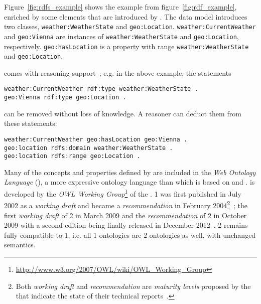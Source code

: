 Figure~\ref{fig:rdfs_example} shows the example from figure~\ref{fig:rdf_example}, enriched by some elements that are introduced by . The data model introduces two classes, \texttt{weather:\hspace{0pt}Weather\hspace{0pt}State} and \texttt{geo:\hspace{0pt}Location}. \texttt{weather:\hspace{0pt}CurrentWeather} and \texttt{geo:\hspace{0pt}Vienna} are instances of \texttt{weather:\hspace{0pt}Weather\hspace{0pt}State} and \texttt{geo:\hspace{0pt}Location}, respectively. \texttt{geo:\hspace{0pt}has\hspace{0pt}Location} is a property with range \texttt{weather:\hspace{0pt}Weather\hspace{0pt}State} and \texttt{geo:\hspace{0pt}Location}.

 comes with reasoning support~\cite{RDF_semantics}; e.g. in the above example, the statements

\begin{lstlisting}
weather:CurrentWeather rdf:type weather:WeatherState .
geo:Vienna rdf:type geo:Location .
\end{lstlisting}

can be removed without loss of knowledge. A reasoner can deduct them from these statements:

\begin{lstlisting}
weather:CurrentWeather geo:hasLocation geo:Vienna .
geo:location rdfs:domain weather:WeatherState .
geo:location rdfs:range geo:Location .
\end{lstlisting}

\vspace{1em}

Many of the concepts and properties defined by  are included in the \emph{Web Ontology Language} (), a more expressive ontology language than  which is based on  and .  is developed by the \emph{OWL Working Group}\footnote{\href{http://www.w3.org/2007/OWL/wiki/OWL\_Working\_Group}{http://www.w3.org/2007/OWL/wiki/OWL\_Working\_Group}} of the .  1 was first published in July 2002 as a \emph{working draft} and became a  \emph{recommendation} in February 2004\footnote{Both \emph{working draft} and \emph{recommendation} are \emph{maturity levels} proposed by the  that indicate the state of their technical reports~\cite{w3c-process}.}~\cite{OWL1}; the first \emph{working draft} of  2 in March 2009 and the  \emph{recommendation} of  2 in October 2009 with a second edition being finally released in December 2012~\cite{OWL}.
 2 remains fully compatible to  1, i.e. all  1 ontologies are  2 ontologies as well, with unchanged semantics.

